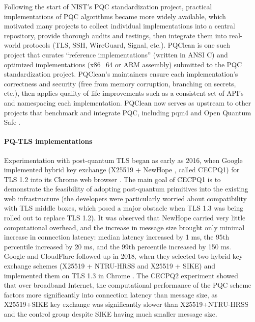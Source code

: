 \documentclass[letterpaper,12pt,titlepage,oneside,final]{book}
\begin{document}
Following the start of NIST's PQC standardization project, practical implementations of PQC algorithms became more widely available, which motivated many projects to collect individual implementations into a central repository, provide thorough audits and testings, then integrate them into real-world protocols (TLS, SSH, WireGuard, Signal, etc.).
PQClean \cite{DBLP:conf/eurosp/KannwischerSSW22} is one such project that curates ``reference implementations'' (written in ANSI C) and optimized implementations (x86\_64 or ARM assembly) submitted to the PQC standardization project.
PQClean's maintainers ensure each implementation's correctness and security (free from memory corruption, branching on secrets, etc.), then applies quality-of-life improvements such as a consistent set of API's and namespacing each implementation.
PQClean now serves as upstream to other projects that benchmark and integrate PQC, including pqm4 \cite{DBLP:journals/iacr/KannwischerRSS19,DBLP:journals/iacr/KannwischerKPY24} and Open Quantum Safe \cite{DBLP:conf/sacrypt/StebilaM16}.

\paragraph{PQ-TLS implementations} Experimentation with post-quantum TLS began as early as 2016, when Google implemented hybrid key exchange (X25519 + NewHope \cite{DBLP:conf/uss/AlkimDPS16}, called CECPQ1) for TLS 1.2 into its Chrome web browser \cite{langley2016cecpq1}.
The main goal of CECPQ1 is to demonstrate the feasibility of adopting post-quantum primitives into the existing web infrastructure (the developers were particularly worried about compatibility with TLS middle boxes, which posed a major obstacle when TLS 1.3 was being rolled out to replace TLS 1.2).
It was observed that NewHope carried very little computational overhead, and the increase in message size brought only minimal increase in connection latency: median latency increased by 1 ms, the 95th percentile increased by 20 ms, and the 99th percentile increased by 150 ms.
Google and CloudFlare followed up in 2018, when they selected two hybrid key exchange schemes (X25519 + NTRU-HRSS \cite{hulsing2017ntruhrss} and X25519 + SIKE) and implemented them on TLS 1.3 in Chrome \cite{langley2018cecpq2}.
The CECPQ2 experiment showed that over broadband Internet, the computational performance of the PQC scheme factors more significantly into connection latency than message size, as X25519+SIKE key exchange was significantly slower than X25519+NTRU-HRSS and the control group despite SIKE having much smaller message size.
\end{document}

